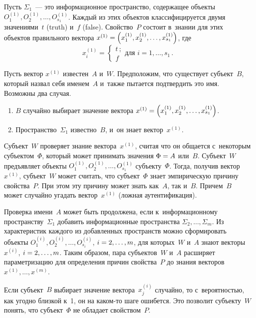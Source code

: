\begin{multicols}{2}
  Пусть $\Sigma_1$~--- это информационное пространство, содержащее объекты 
$O_1^{(1)}, O_2^{(1)},\ldots , O_{s_1}^{(1)}$. Каждый из этих объектов 
классифицируется двумя значениями~$t$ (truth) и~$f$ (false). Свойство~$P$ 
состоит в~знании для этих объектов правильного вектора $x^{(1)}\hm= \left( 
x_1^{(1)}, x_2^{(1)}, \ldots , x^{(1)}_{s_1}\right)$, где 
  $$
  x_i^{(1)}= \begin{cases}
  t\,;\\ f
  \end{cases}
  \mbox{для } i=1, \ldots , s_1\,. 
  $$
  
  Пусть вектор $x^{(1)}$ известен~$A$ и~$W$. Предположим, что существует 
субъект~$B$, который назвал себя именем~$A$ и~также пытается подтвердить это 
имя. Возможны два случая.
  \begin{enumerate}[1.]
  \item $B$ случайно выбирает значение вектора $x^{(1)}\hm= \left( x_1^{(1)}, 
x_2^{(1)}, \ldots , x_{s_1}^{(1)}\right)$.
\item Пространство~$\Sigma_1$ известно~$B$, и~он знает вектор~$x^{(1)}$.
\end{enumerate}

  Субъект~$W$ проверяет знание вектора~$x^{(1)}$, считая что он общается 
  с~некоторым субъектом~$\Phi$, который может принимать значения $\Phi\hm=A$ 
или~$B$. Субъект~$W$ предъявляет объекты $O_1^{(1)}, O_2^{(1)}, 
\ldots , O_{s_1}^{(1)}$ субъекту~$\Phi$. Тогда, получив вектор~$x^{(1)}$, 
субъект~$W$ может считать, что субъект~$\Phi$ знает эмпирическую причину 
свойства~$P$. При этом эту причину может знать как~$A$, так и~$B$. 
Причем~$B$ может случайно угадать вектор~$x^{(1)}$ (ложная аутентификация).
  
  Проверка имени~$A$ может быть продолжена, если к~информационному 
пространству~$\Sigma_1$ добавить информационные пространства 
$\Sigma_2,\ldots , \Sigma_m$. Из характеристик каждого из добавленных 
пространств можно сформировать объекты $O_1^{(i)}, O_2^{(i)}, \ldots , 
O^{(i)}_{s_i}$, $i\hm=2, \ldots ,m$, для которых~$W$ и~$A$ знают 
векторы~$x^{(i)}$, $i\hm=2,\ldots , m$. Таким образом, пара субъектов~$W$ 
и~$A$ расширяет параметризацию для определения причин свойства~$P$ до 
знания векторов $x^{(1)}, \ldots , x^{(m)}$.
  
  Если субъект~$B$ выбирает значение вектора~$x_j^{(i)}$ случайно, то 
с~вероятностью, как угодно близкой к~1, он на ка\-ком-то шаге ошибется. Это 
позволит субъекту~$W$ понять, что субъект~$\Phi$ не обладает свойством~$P$.
  

\end{multicols}
